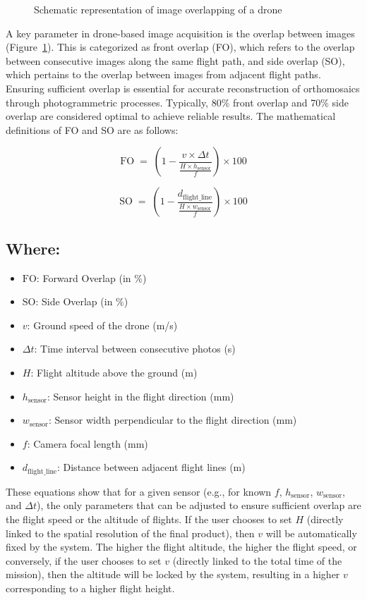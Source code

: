 \documentclass[
  letterpaper,
  11pt,
  english,
  singlespacing,
  headsepline]{MastersDoctoralThesis}
\begin{document}
\begin{spacing}{1.5}
\begin{figure}
{}

\caption{\label{fig-overlaps}Schematic representation of image
overlapping of a drone}

\end{figure}%

A key parameter in drone-based image acquisition is the overlap between
images (Figure~\ref{fig-overlaps}). This is categorized as front overlap
(FO), which refers to the overlap between consecutive images along the
same flight path, and side overlap (SO), which pertains to the overlap
between images from adjacent flight paths. Ensuring sufficient overlap
is essential for accurate reconstruction of orthomosaics through
photogrammetric processes. Typically, 80\% front overlap and 70\% side
overlap are considered optimal to achieve reliable results. The
mathematical definitions of FO and SO are as follows:

\[
\text{FO} \;=\;
\left(1 - \frac{v \times \Delta t}{
  \frac{H \times h_{\text{sensor}}}{f}
}\right) \times 100
\]

\[
\text{SO} \;=\;
\left(1 - \frac{d_{\text{flight\_line}}}{
  \frac{H \times w_{\text{sensor}}}{f}
}\right) \times 100
\]

\subsection*{Where: }
\begin{itemize}
  \item $\text{FO}$: Forward Overlap (in \%)
  \item $\text{SO}$: Side Overlap (in \%)
  \item $v$: Ground speed of the drone (m/s)
  \item $\Delta t$: Time interval between consecutive photos (s)
  \item $H$: Flight altitude above the ground (m)
  \item $h_{\text{sensor}}$: Sensor height in the flight direction (mm)
  \item $w_{\text{sensor}}$: Sensor width perpendicular to the flight direction (mm)
  \item $f$: Camera focal length (mm)
  \item $d_{\text{flight\_line}}$: Distance between adjacent flight lines (m)
\end{itemize}

These equations show that for a given sensor (e.g., for known \(f\),
\(h_{\text{sensor}}\), \(w_{\text{sensor}}\), and \(\Delta t\)), the
only parameters that can be adjusted to ensure sufficient overlap are
the flight speed or the altitude of flights. If the user chooses to set
\(H\) (directly linked to the spatial resolution of the final product),
then \(v\) will be automatically fixed by the system. The higher the
flight altitude, the higher the flight speed, or conversely, if the user
chooses to set \(v\) (directly linked to the total time of the mission),
then the altitude will be locked by the system, resulting in a higher
\(v\) corresponding to a higher flight height.


\end{spacing}
\end{document}

